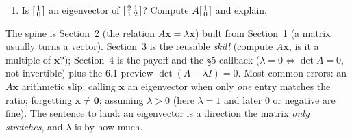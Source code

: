 \documentclass[10pt]{article}
\newcommand{\xx}{\mathbf{x}}
\newcommand{\zero}{\mathbf{0}}
\begin{document}
\begin{practicebox}
\begin{enumerate}[leftmargin=1.6em, itemsep=4pt]
  \item Is $\begin{bsmallmatrix} 1\\ 0 \end{bsmallmatrix}$ an eigenvector of $\begin{bsmallmatrix} 2 & 1\\ 1 & 2 \end{bsmallmatrix}$? Compute $A\begin{bsmallmatrix} 1\\ 0 \end{bsmallmatrix}$ and explain. 
\end{enumerate}
\end{practicebox}

\begin{teachernote}
The spine is Section~2 (the relation $A\xx=\lambda\xx$) built from Section~1 (a matrix usually turns
a vector). Section~3 is the reusable \emph{skill} (compute $A\xx$, is it a multiple of $\xx$?);
Section~4 is the payoff and the §5 callback ($\lambda=0\Leftrightarrow\det A=0$, not invertible) plus
the 6.1 preview $\det(A-\lambda I)=0$. Most common errors: an $A\xx$ arithmetic slip; calling $\xx$ an
eigenvector when only \emph{one} entry matches the ratio; forgetting $\xx\ne\zero$; assuming $\lambda>0$
(here $\lambda=1$ and later $0$ or negative are fine). The sentence to land: an eigenvector is a
direction the matrix \emph{only stretches}, and $\lambda$ is by how much.
\end{teachernote}
\end{document}
